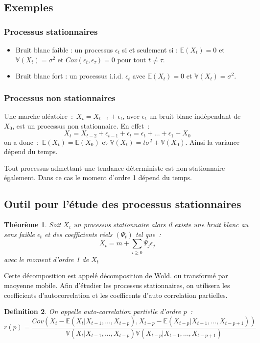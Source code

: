 \documentclass[11pt]{scrartcl} %
\newtheorem{theorem}{Théorème}[section]
\newtheorem{Def}[theorem]{Definition}
\begin{document}
\subsection{Exemples}
\subsubsection{Processus stationnaires}
\begin{itemize}
\item Bruit blanc faible : un processus $\epsilon_t$ si et seulement si : $\mathbb{E}\left(X_t\right)=0$ et $\mathbb{V}\left(X_t\right)= \sigma^2$ et $Cov(\epsilon_t,\epsilon_{\tau})=0$ pour tout $t\not=\tau$.\\
\item Bruit blanc fort : un processus i.i.d. $\epsilon_t$ avec $\mathbb{E}\left(X_t\right)=0$ et $\mathbb{V}\left(X_t\right)= \sigma^2$.
\end{itemize}

\subsubsection{Processus non stationnaires}
Une marche aléatoire~:~$X_t=X_{t-1}+\epsilon_t$, avec $\epsilon_t$ un bruit blanc indépendant de $X_0$, est un processus non stationnaire. En effet~:~
$$
X_t=X_{t-2}+\epsilon_{t-1}+\epsilon_t=\epsilon_t+...+\epsilon_1+X_0
$$
on a donc~:~$\mathbb{E}\left(X_t\right)=\mathbb{E}\left(X_0\right)$ et $\mathbb{V}\left(X_t\right)=t\sigma^2+\mathbb{V}\left(X_0\right)$. Ainsi la variance dépend du temps.


Tout processus admettant une tendance déterministe est non stationnaire également. Dans ce cas le moment d'ordre 1 dépend du temps.


\subsection{Outil pour l'étude des processus stationnaires}
\begin{theorem}
Soit $X_t$ un processus stationnaire alors il existe une bruit blanc au sens faible $\epsilon_t$ et des coefficients réels $\left(\Psi_t\right)$ tel que~:
$$
X_t = m+\sum_{i\geq 0}\Psi_j\epsilon_j
$$
avec le moment d'ordre 1 de $X_t$
\end{theorem}
Cette décomposition est appelé décomposition de Wold. ou transformé par maoyenne mobile.
Afin d'étudier les processus stationnaires, on utilisera les coefficients d'autocorrelation et les coefficents d'auto correlation partielles.
\begin{Def}
On appelle auto-correlation partielle d'ordre p~:
$$
r(p)=\frac{Cov\left(X_t-\mathbb{E}\left(X_t|X_{t-1},...,X_{t-p}\right),X_{t-p}-\mathbb{E}\left(X_{t-p}|X_{t-1},...,X_{t-p+1}\right)\right)}{\mathbb{V}\left(X_t|X_{t-1},...,X_{t-p}\right)\mathbb{V}\left(X_{t-p}|X_{t-1},...,X_{t-p+1}\right)}
$$
\end{Def}
\end{document}
